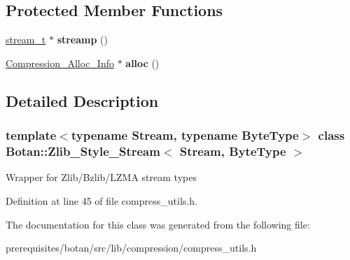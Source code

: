 \subsection*{Protected Member Functions}
\begin{DoxyCompactItemize}
\item 
\mbox{\label{class_botan_1_1_zlib___style___stream_ae6c4999a2dd36a6dbb051ed6e80c5077}} 
\mbox{\hyperlink{struct_stream}{stream\+\_\+t}} $\ast$ {\bfseries streamp} ()
\item 
\mbox{\label{class_botan_1_1_zlib___style___stream_ad48b09232b72064f05be0a544a1ba42f}} 
\mbox{\hyperlink{class_botan_1_1_compression___alloc___info}{Compression\+\_\+\+Alloc\+\_\+\+Info}} $\ast$ {\bfseries alloc} ()
\end{DoxyCompactItemize}


\subsection{Detailed Description}
\subsubsection*{template$<$typename Stream, typename Byte\+Type$>$\newline
class Botan\+::\+Zlib\+\_\+\+Style\+\_\+\+Stream$<$ Stream, Byte\+Type $>$}

Wrapper for Zlib/\+Bzlib/\+L\+Z\+MA stream types 

Definition at line 45 of file compress\+\_\+utils.\+h.



The documentation for this class was generated from the following file\+:\begin{DoxyCompactItemize}
\item 
prerequisites/botan/src/lib/compression/compress\+\_\+utils.\+h\end{DoxyCompactItemize}

